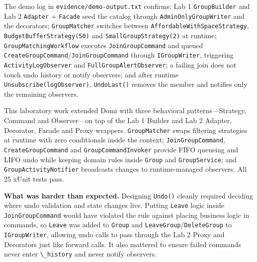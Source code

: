 \documentclass{utmreport}
\providecommand{\passthrough}[1]{#1}
\begin{document}
The demo log in \passthrough{\lstinline!evidence/demo-output.txt!} confirms: Lab 1 \passthrough{\lstinline!GroupBuilder!} and Lab 2 \passthrough{\lstinline!Adapter!} + \passthrough{\lstinline!Facade!} seed the catalog through \passthrough{\lstinline!AdminOnlyGroupWriter!} and the decorators; \passthrough{\lstinline!GroupMatcher!} switches between \passthrough{\lstinline!AffordableWithSpaceStrategy!}, \passthrough{\lstinline!BudgetBufferStrategy(50)!} and \passthrough{\lstinline!SmallGroupStrategy(2)!} at runtime; \passthrough{\lstinline!GroupMatchingWorkflow!} executes \passthrough{\lstinline!JoinGroupCommand!} and queued \passthrough{\lstinline!CreateGroupCommand!}/\passthrough{\lstinline!JoinGroupCommand!} through \passthrough{\lstinline!IGroupWriter!}, triggering \passthrough{\lstinline!ActivityLogObserver!} and \passthrough{\lstinline!FullGroupAlertObserver!}; a failing join does not touch undo history or notify observers; and after runtime \passthrough{\lstinline!Unsubscribe(logObserver)!}, \passthrough{\lstinline!UndoLast()!} removes the member and notifies only the remaining observers.

\utmconclusions
This laboratory work extended Domi with three behavioral patterns---Strategy, Command and Observer---on top of the Lab 1 Builder and Lab 2 Adapter, Decorator, Facade and Proxy wrappers. \passthrough{\lstinline!GroupMatcher!} swaps filtering strategies at runtime with zero conditionals inside the context; \passthrough{\lstinline!JoinGroupCommand!}, \passthrough{\lstinline!CreateGroupCommand!} and \passthrough{\lstinline!GroupCommandInvoker!} provide FIFO queueing and LIFO undo while keeping domain rules inside \passthrough{\lstinline!Group!} and \passthrough{\lstinline!GroupService!}; and \passthrough{\lstinline!GroupActivityNotifier!} broadcasts changes to runtime-managed observers. All 25 xUnit tests pass.

\textbf{What was harder than expected.} Designing \passthrough{\lstinline!Undo()!} cleanly required deciding where undo validation and state changes live. Putting \passthrough{\lstinline!Leave!} logic inside \passthrough{\lstinline!JoinGroupCommand!} would have violated the rule against placing business logic in commands, so \passthrough{\lstinline!Leave!} was added to \passthrough{\lstinline!Group!} and \passthrough{\lstinline!LeaveGroup!}/\passthrough{\lstinline!DeleteGroup!} to \passthrough{\lstinline!IGroupWriter!}, allowing undo calls to pass through the Lab 2 Proxy and Decorators just like forward calls. It also mattered to ensure failed commands never enter \passthrough{\lstinline!\_history!} and never notify observers.
\end{document}

